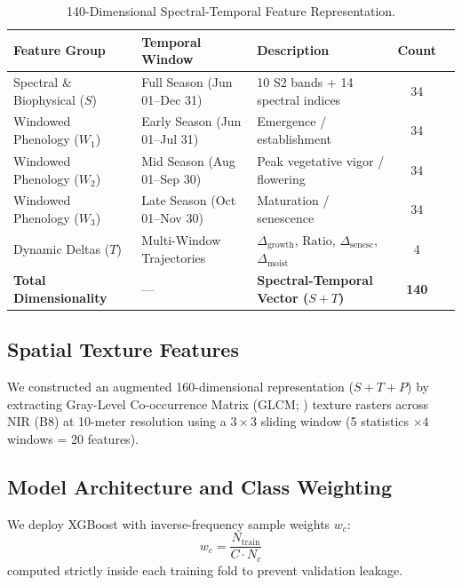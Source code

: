 \documentclass[runningheads]{llncs}
\begin{document}
\begin{table}[t]
\centering
\caption{140-Dimensional Spectral-Temporal Feature Representation.}
\label{tab:features}
\small
\begin{tabular}{lllcc}
\toprule
\textbf{Feature Group} & \textbf{Temporal Window} & \textbf{Description} & \textbf{Count} \\
\midrule
Spectral \& Biophysical ($S$) & Full Season (Jun 01--Dec 31) & 10 S2 bands + 14 spectral indices & 34 \\
Windowed Phenology ($W_1$) & Early Season (Jun 01--Jul 31) & Emergence / establishment & 34 \\
Windowed Phenology ($W_2$) & Mid Season (Aug 01--Sep 30) & Peak vegetative vigor / flowering & 34 \\
Windowed Phenology ($W_3$) & Late Season (Oct 01--Nov 30) & Maturation / senescence & 34 \\
Dynamic Deltas ($T$) & Multi-Window Trajectories & $\Delta_\text{growth}$, $\text{Ratio}$, $\Delta_\text{senesc}$, $\Delta_\text{moist}$ & 4 \\
\midrule
\textbf{Total Dimensionality} & — & \textbf{Spectral-Temporal Vector ($S+T$)} & \textbf{140} \\
\bottomrule
\end{tabular}
\end{table}

\subsection{Spatial Texture Features}
We constructed an augmented 160-dimensional representation ($S+T+P$) by extracting Gray-Level Co-occurrence Matrix (GLCM; \cite{haralick1973}) texture rasters across NIR (B8) at 10-meter resolution using a $3\times3$ sliding window (5 statistics $\times 4$ windows = 20 features).

\subsection{Model Architecture and Class Weighting}
We deploy XGBoost \cite{chen2016} with inverse-frequency sample weights $w_c$:
\begin{equation}
w_c = \frac{N_\text{train}}{C \cdot N_c}
\end{equation}
computed strictly inside each training fold to prevent validation leakage.
\end{document}
